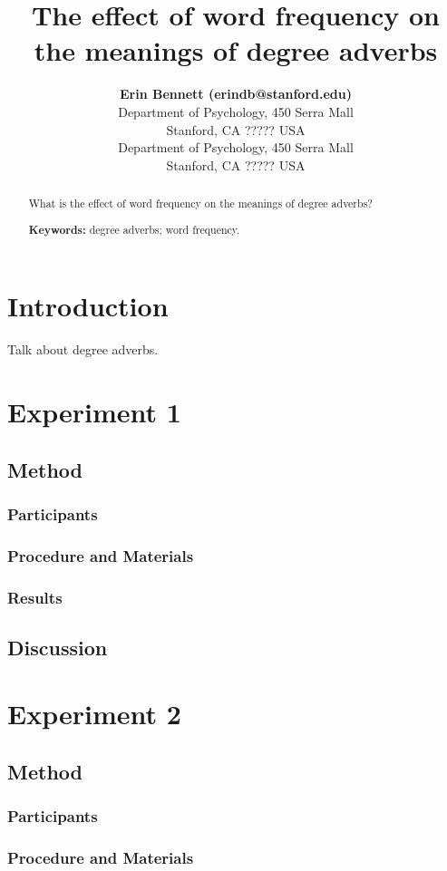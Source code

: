 \documentclass[10pt,letterpaper]{article}
\title{The effect of word frequency on the meanings of degree adverbs}
\author{{\large \bf Erin Bennett (erindb@stanford.edu)} \\
  Department of Psychology, 450 Serra Mall \\
  Stanford, CA ????? USA
  \AND {\large \bf Noah Goodman (ngoodman@stanford.edu)} \\
  Department of Psychology, 450 Serra Mall \\
  Stanford, CA ????? USA}
\begin{document}
\maketitle


\begin{abstract}
What is the effect of word frequency on the meanings of degree adverbs?

\textbf{Keywords:} 
degree adverbs; word frequency.
\end{abstract}


\section{Introduction}

Talk about degree adverbs.


\section{Experiment 1}
  \subsection{Method}
    \subsubsection{Participants}
    \subsubsection{Procedure and Materials}
  \subsubsection{Results}
  \subsection{Discussion}

\section{Experiment 2}
  \subsection{Method}
    \subsubsection{Participants}
    \subsubsection{Procedure and Materials}
\end{document}
